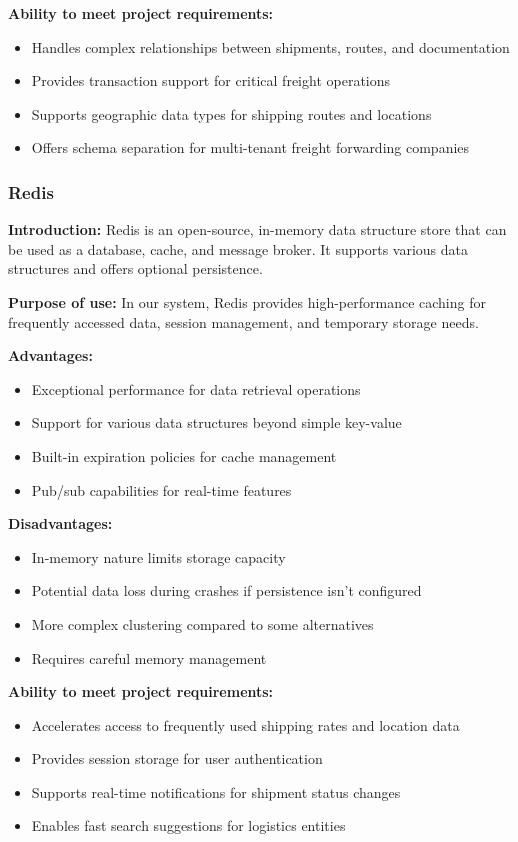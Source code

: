 \textbf{Ability to meet project requirements:}
\begin{itemize}
    \item Handles complex relationships between shipments, routes, and documentation
    \item Provides transaction support for critical freight operations
    \item Supports geographic data types for shipping routes and locations
    \item Offers schema separation for multi-tenant freight forwarding companies
\end{itemize}

\subsubsection{Redis}
\textbf{Introduction:} Redis \cite{redis} is an open-source, in-memory data structure store that can be used as a database, cache, and message broker. It supports various data structures and offers optional persistence.

\textbf{Purpose of use:} In our system, Redis provides high-performance caching for frequently accessed data, session management, and temporary storage needs.

\textbf{Advantages:}
\begin{itemize}
    \item Exceptional performance for data retrieval operations
    \item Support for various data structures beyond simple key-value
    \item Built-in expiration policies for cache management
    \item Pub/sub capabilities for real-time features
\end{itemize}

\textbf{Disadvantages:}
\begin{itemize}
    \item In-memory nature limits storage capacity
    \item Potential data loss during crashes if persistence isn't configured
    \item More complex clustering compared to some alternatives
    \item Requires careful memory management
\end{itemize}

\textbf{Ability to meet project requirements:}
\begin{itemize}
    \item Accelerates access to frequently used shipping rates and location data
    \item Provides session storage for user authentication
    \item Supports real-time notifications for shipment status changes
    \item Enables fast search suggestions for logistics entities
\end{itemize}

